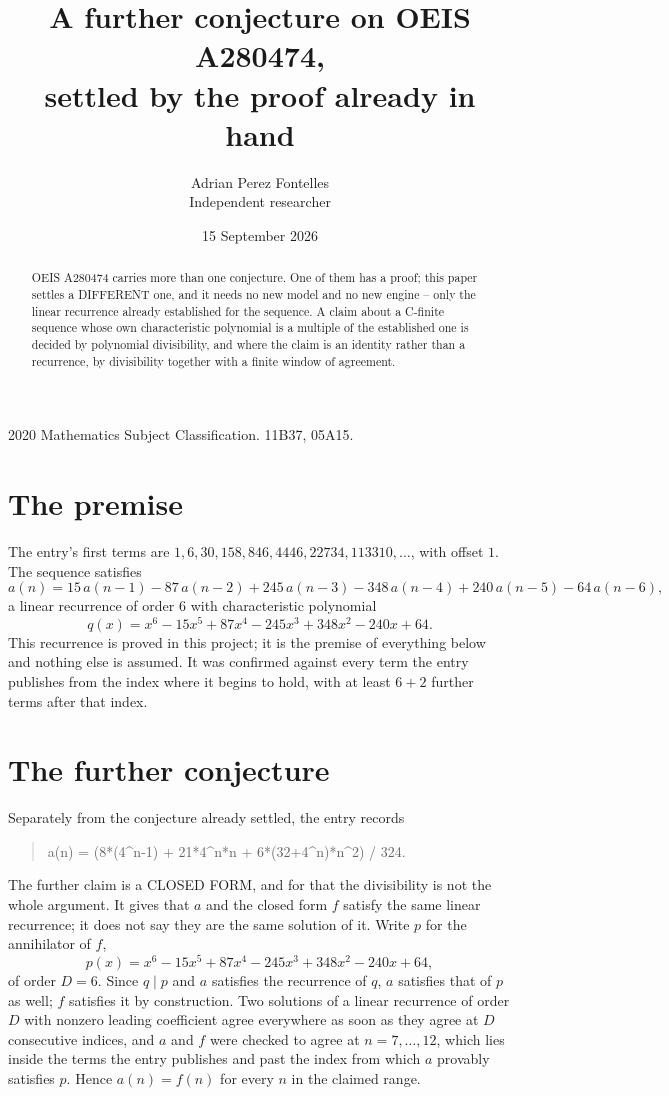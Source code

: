 \documentclass[11pt,a4paper]{article}
\title{A further conjecture on OEIS A280474,\\ \large settled by the proof already in hand}
\author{Adrian Perez Fontelles\\ \small Independent researcher}
\date{15 September 2026}
\theoremstyle{plain}
\theoremstyle{definition}
\begin{document}
\maketitle

\begin{abstract}
OEIS A280474 carries more than one conjecture. One of them has a proof; this paper settles a
DIFFERENT one, and it needs no new model and no new engine -- only the linear recurrence already
established for the sequence. A claim about a C-finite sequence whose own characteristic
polynomial is a multiple of the established one is decided by polynomial divisibility, and where
the claim is an identity rather than a recurrence, by divisibility together with a finite window
of agreement.
\end{abstract}

\noindent\small 2020 Mathematics Subject Classification. 11B37, 05A15.\normalsize

\section{The premise}

The entry's first terms are $1, 6, 30, 158, 846, 4446, 22734, 113310,\dots$, with offset $1$. The sequence satisfies
\[
  a(n)=15\,a(n-1) - 87\,a(n-2) + 245\,a(n-3) - 348\,a(n-4) + 240\,a(n-5) - 64\,a(n-6) ,
\]
a linear recurrence of order $6$ with characteristic polynomial
\[
  q(x)=x^{6} - 15 x^{5} + 87 x^{4} - 245 x^{3} + 348 x^{2} - 240 x + 64 .
\]
This recurrence is proved in this project; it is the premise of everything below and nothing else is assumed.
It was confirmed against every term the entry publishes from the index where it begins to hold,
with at least $6+2$ further terms after that index.

\section{The further conjecture}

Separately from the conjecture already settled, the entry records

\begin{quote}\raggedright a(n) = (8*(4\^{}n-1) + 21*4\^{}n*n + 6*(32+4\^{}n)*n\^{}2) / 324.\end{quote}

The further claim is a CLOSED FORM, and for that the divisibility is not the whole argument. It
gives that $a$ and the closed form $f$ satisfy the same linear recurrence; it does not say they
are the same solution of it. Write $p$ for the annihilator of $f$,
\[
  p(x)=x^{6} - 15 x^{5} + 87 x^{4} - 245 x^{3} + 348 x^{2} - 240 x + 64 ,
\]
of order $D=6$. Since $q\mid p$ and $a$ satisfies the recurrence of $q$, $a$ satisfies that of
$p$ as well; $f$ satisfies it by construction. Two solutions of a linear recurrence of order $D$
with nonzero leading coefficient agree everywhere as soon as they agree at $D$ consecutive
indices, and $a$ and $f$ were checked to agree at $n=7,\dots,12$,
which lies inside the terms the entry publishes and past the index from which $a$ provably
satisfies $p$. Hence $a(n)=f(n)$ for every $n$ in the claimed range.
\end{document}
